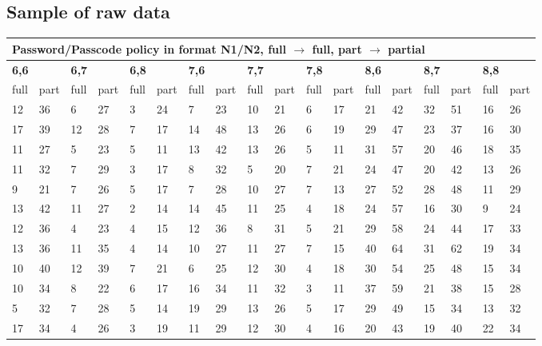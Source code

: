 \documentclass[british,11pt,a4paper]{article}
\begin{document}
\begin{appendices}
	\subsection{Sample of raw data}
	\label{app:raw_data}
	\begin{longtable}{|l|l|l|l|l|l|l|l|l|l|l|l|l|l|l|l|l|l|}
	\hline
	\multicolumn{18}{|l|}{\textbf{Password/Passcode policy in format N1/N2, full $\rightarrow$ full, part $\rightarrow$ partial}} \\ \hline
	\multicolumn{2}{|l|}{\textbf{6,6}} & \multicolumn{2}{l|}{\textbf{6,7}} & \multicolumn{2}{l|}{\textbf{6,8}} & \multicolumn{2}{l|}{\textbf{7,6}} & \multicolumn{2}{l|}{\textbf{7,7}} & \multicolumn{2}{l|}{\textbf{7,8}} & \multicolumn{2}{l|}{\textbf{8,6}} & \multicolumn{2}{l|}{\textbf{8,7}} & \multicolumn{2}{l|}{\textbf{8,8}} \\ \hline
	full & part & full & part & full & part & full & part & full & part & full & part & full & part & full & part & full & part \\ \hline
	12 & 36 & 6 & 27 & 3 & 24 & 7 & 23 & 10 & 21 & 6 & 17 & 21 & 42 & 32 & 51 & 16 & 26 \\ \hline
	17 & 39 & 12 & 28 & 7 & 17 & 14 & 48 & 13 & 26 & 6 & 19 & 29 & 47 & 23 & 37 & 16 & 30 \\ \hline
	11 & 27 & 5 & 23 & 5 & 11 & 13 & 42 & 13 & 26 & 5 & 11 & 31 & 57 & 20 & 46 & 18 & 35 \\ \hline
	11 & 32 & 7 & 29 & 3 & 17 & 8 & 32 & 5 & 20 & 7 & 21 & 24 & 47 & 20 & 42 & 13 & 26 \\ \hline
	9 & 21 & 7 & 26 & 5 & 17 & 7 & 28 & 10 & 27 & 7 & 13 & 27 & 52 & 28 & 48 & 11 & 29 \\ \hline
	13 & 42 & 11 & 27 & 2 & 14 & 14 & 45 & 11 & 25 & 4 & 18 & 24 & 57 & 16 & 30 & 9 & 24 \\ \hline
	12 & 36 & 4 & 23 & 4 & 15 & 12 & 36 & 8 & 31 & 5 & 21 & 29 & 58 & 24 & 44 & 17 & 33 \\ \hline
	13 & 36 & 11 & 35 & 4 & 14 & 10 & 27 & 11 & 27 & 7 & 15 & 40 & 64 & 31 & 62 & 19 & 34 \\ \hline
	10 & 40 & 12 & 39 & 7 & 21 & 6 & 25 & 12 & 30 & 4 & 18 & 30 & 54 & 25 & 48 & 15 & 34 \\ \hline
	10 & 34 & 8 & 22 & 6 & 17 & 16 & 34 & 11 & 32 & 3 & 11 & 37 & 59 & 21 & 38 & 15 & 28 \\ \hline
	5 & 32 & 7 & 28 & 5 & 14 & 19 & 29 & 13 & 26 & 5 & 17 & 29 & 49 & 15 & 34 & 13 & 32 \\ \hline
	17 & 34 & 4 & 26 & 3 & 19 & 11 & 29 & 12 & 30 & 4 & 16 & 20 & 43 & 19 & 40 & 22 & 34 \\ \hline

\end{longtable}
\end{appendices}
\end{document}
